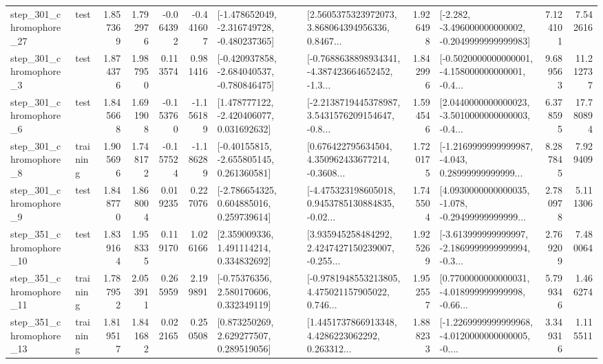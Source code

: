 \begin{tabular}{llrrrrllrlrr}
  step\_301\_chromophore\_27 &      test &      1.857369 &    1.792976 &     -0.064392 & -0.441607 &  [-1.478652049, -2.316749728, -0.480237365] &  [2.5605375323972073, 3.868064394956336, 0.8467... &       1.926498 &  [-2.282, -3.496000000000002, -0.2049999999999983] &            7.124101 &          7.542616 \\
   step\_301\_chromophore\_3 &      test &      1.874376 &    1.987950 &      0.113574 &  0.981416 &  [-0.420937858, -2.684040537, -0.780846475] &  [-0.7688638898934341, -4.387423664652452, -1.3... &       1.842996 &  [-0.5020000000000001, -4.158000000000001, -0.4... &            9.689563 &         11.212737 \\
   step\_301\_chromophore\_6 &      test &      1.845668 &    1.691908 &     -0.153760 & -1.156189 &    [1.478777122, -2.420406077, 0.031692632] &  [-2.2138719445378987, 3.5431576209154647, -0.8... &       1.594546 &  [2.0440000000000023, -3.5010000000000003, -0.4... &            6.378595 &         17.780894 \\
   step\_301\_chromophore\_8 &  training &      1.905696 &    1.748172 &     -0.157524 & -1.186289 &    [-0.40155815, -2.655805145, 0.261360581] &  [0.676422795634504, 4.350962433677214, -0.3608... &       1.720175 &  [-1.2169999999999987, -4.043, 0.28999999999999... &            8.287845 &          7.929409 \\
   step\_301\_chromophore\_9 &      test &      1.848770 &    1.868004 &      0.019235 &  0.227076 &    [-2.786654325, 0.604885016, 0.259739614] &  [-4.475323198605018, 0.9453785130884835, -0.02... &       1.745504 &  [4.0930000000000035, -1.078, -0.29499999999999... &            2.780978 &          5.111306 \\
  step\_351\_chromophore\_10 &      test &      1.839164 &    1.958335 &      0.119170 &  1.026166 &     [2.359009336, 1.491114214, 0.334832692] &  [3.935945258484292, 2.4247427150239007, -0.255... &       1.925269 &  [-3.613999999999997, -2.1869999999999994, -0.3... &            2.769209 &          7.480064 \\
  step\_351\_chromophore\_11 &  training &      1.787952 &    2.053911 &      0.265959 &  2.199891 &     [-0.75376356, 2.580170606, 0.332349119] &  [-0.9781948553213805, 4.475021157905022, 0.746... &       1.952557 &  [0.7700000000000031, -4.018999999999998, -0.66... &            5.799346 &          1.466274 \\
  step\_351\_chromophore\_13 &  training &      1.819517 &    1.841682 &      0.022165 &  0.250508 &     [0.873250269, 2.629277507, 0.289519056] &  [1.4451737866913348, 4.4286223062292, 0.263312... &       1.888233 &  [-1.2269999999999968, -4.0120000000000005, -0.... &            3.349316 &          1.115511 \\

\end{tabular}
